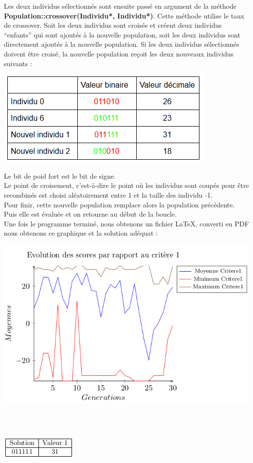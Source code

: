 \documentclass[a4paper,11pt]{article}
\begin{document}
			Les deux individus sélectionnés sont ensuite passé en argument de la méthode \textbf{Population::crossover(Individu*, Individu*)}.
			Cette méthode utilise le taux de crossover.
			Soit les deux individus sont croisés et créent deux individus “enfants” qui sont ajoutés à la nouvelle population, soit les deux individus sont directement ajoutés à la nouvelle population.
			Si les deux individus sélectionnés doivent être croisé, la nouvelle population reçoit les deux nouveaux individus suivants :\\
			\centerline{\includegraphics[scale=0.5]{Crossover.png}}
			Le bit de poid fort est le bit de signe.\\
			Le point de croisement, c’est-à-dire le point où les individus sont coupés pour être recombinés est choisi aléatoirement entre 1 et la taille des individu -1.\\
			
			Pour finir, cette nouvelle population remplace alors la population précédente. Puis elle est évaluée et on retourne au début de la boucle.\\
			
			Une fois le programme terminé, nous obtenons un fichier LaTeX, converti en PDF nous obtenons ce graphique et la solution adéquat :\\
			\centerline{\includegraphics[scale=0.5]{Graphe.png}}\\\\
			\centerline{\includegraphics[scale=0.5]{Resultats.png}}\\
			
\end{document}
